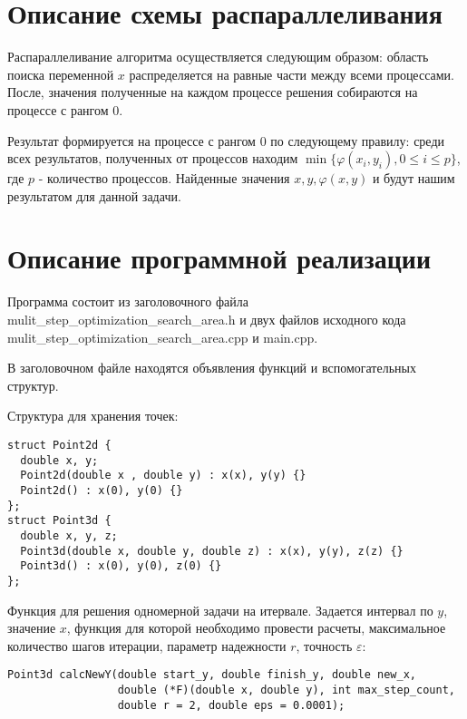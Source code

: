 \documentclass{report}
\begin{document}
\newpage

\section*{Описание схемы распараллеливания}
\par Распараллеливание алгоритма осуществляется следующим образом: область поиска переменной $x$ распределяется на равные части между всеми процессами. После, значения полученные на каждом процессе решения собираются на процессе с рангом 0.
\par Результат формируется на процессе с рангом 0 по следующему правилу: среди всех результатов, полученных от процессов находим $\min \{\varphi(x_i,y_i), 0 \leq i \leq p\}$, где $p$ - количество процессов. Найденные значения $x,y,\varphi(x,y)$ и будут нашим результатом для данной задачи.

\newpage

\section*{Описание программной реализации}
Программа состоит из заголовочного файла mulit\_step\_optimization\_search\_area.h и двух файлов исходного кода mulit\_step\_optimization\_search\_area.cpp и main.cpp.
\par В заголовочном файле находятся объявления функций и вспомогательных структур.
\par Структура для хранения точек:
\begin{lstlisting}
struct Point2d {
  double x, y;
  Point2d(double x , double y) : x(x), y(y) {}
  Point2d() : x(0), y(0) {}
};
struct Point3d {
  double x, y, z;
  Point3d(double x, double y, double z) : x(x), y(y), z(z) {}
  Point3d() : x(0), y(0), z(0) {}
};
\end{lstlisting}

\par Функция для решения одномерной задачи на итервале. Задается интервал по $y$, значение $x$, функция для которой необходимо провести расчеты, максимальное количество шагов итерации, параметр надежности $r$, точность $\varepsilon$:
\begin{lstlisting}
Point3d calcNewY(double start_y, double finish_y, double new_x,
				 double (*F)(double x, double y), int max_step_count,
				 double r = 2, double eps = 0.0001);
\end{lstlisting}
\end{document}
